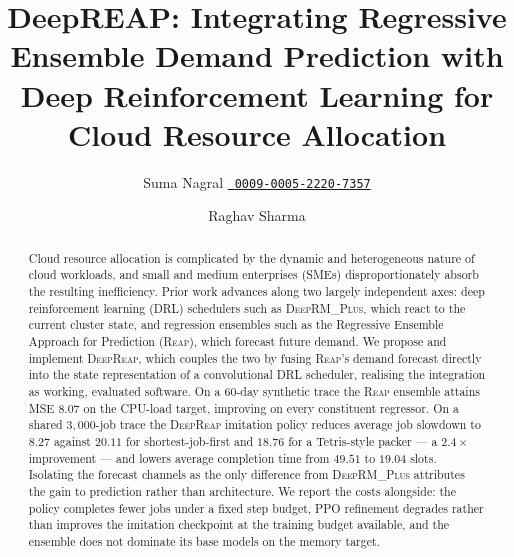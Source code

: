 \documentclass{svproc}
\newcommand{\reap}{\textsc{Reap}}
\newcommand{\deeprm}{\textsc{DeepRM\_Plus}}
\newcommand{\deepreap}{\textsc{DeepReap}}
\newcommand{\orcidID}[1]{%
  \href{https://orcid.org/#1}{%
    {\color[HTML]{A6CE39}\textbullet}~\texttt{#1}}}
\begin{document}
\title{DeepREAP: Integrating Regressive Ensemble Demand Prediction with Deep Reinforcement Learning for Cloud Resource Allocation}



\author{Suma Nagral\orcidID{0009-0005-2220-7357} \and 
        Raghav Sharma}
 

\maketitle

\begin{abstract}
Cloud resource allocation is complicated by the dynamic and
heterogeneous nature of cloud workloads, and small and medium
enterprises (SMEs) disproportionately absorb the resulting
inefficiency. Prior work advances along two largely independent axes:
deep reinforcement learning (DRL) schedulers such as \deeprm{}, which
react to the current cluster state, and regression ensembles such as
the Regressive Ensemble Approach for Prediction (\reap{}), which
forecast future demand. We propose and implement \deepreap{}, which
couples the two by fusing \reap{}'s demand forecast directly into the
state representation of a convolutional DRL scheduler, realising the
integration as working, evaluated software. On a
60-day synthetic trace the \reap{} ensemble attains MSE $8.07$ on the
CPU-load target, improving on every constituent regressor. On a shared
$3{,}000$-job trace the \deepreap{} imitation policy reduces average
job slowdown to $8.27$ against $20.11$ for shortest-job-first and
$18.76$ for a Tetris-style packer --- a $2.4\times$ improvement --- and
lowers average completion time from $49.51$ to $19.04$ slots. Isolating
the forecast channels as the only difference from \deeprm{} attributes
the gain to prediction rather than architecture. We report the costs
alongside: the policy completes fewer jobs under a fixed step budget,
PPO refinement degrades rather than improves the imitation checkpoint
at the training budget available, and the ensemble does not dominate
its base models on the memory target.

\end{abstract}
\end{document}

